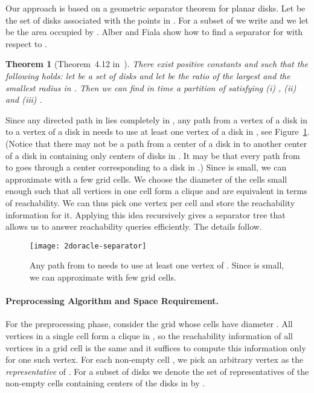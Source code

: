 \documentclass[11pt,a4paper]{paper}
\newtheorem{theorem}{Theorem}[section]
\begin{document}
Our approach is based on a geometric separator theorem for
planar disks.
Let  be the set of disks associated with the points in .
For a subset  of  we write
 and we let
 be the area occupied by .
Alber and Fiala show how to find a separator for 
with respect to  \cite{AlberFiala04}.

\begin{theorem}[Theorem~4.12 in~\cite{AlberFiala04}]
\label{thm:diskseparator}
There exist positive constants  and  such
that the following holds:
let  be a set of  disks and let   be the ratio of the largest
and the smallest radius in .
Then we can find in   time
a partition  of  satisfying
(i) ,
(ii)  and
(iii) .
\end{theorem}
Since any directed path in  lies completely in , any path from
a vertex of a disk in  to a vertex of a disk in  needs to use at least one vertex of a disk in , see
Figure~\ref{fig:separator}.
(Notice that there may not be a path from a center  of a disk in  to another center  of a disk in   containing only centers of disks in . It may be that every path from  to  goes through a center corresponding to a disk in .)
 Since  is small, we can approximate 
with a few grid cells. We choose the diameter of the cells small enough such that
all vertices in one cell form a clique and are equivalent in terms of reachability.
We can thus pick one vertex per cell and store the
reachability information for it. Applying this idea
recursively gives a separator tree
that allows us to answer reachability queries efficiently. The details follow.

\begin{figure}[htb]
\centering
\texttt{[image: 2doracle-separator]}
\caption{Any path from  to  needs to use at least
one vertex of . Since  is small, we can approximate  with
few grid cells.}
\label{fig:separator}
\end{figure}

\paragraph*{Preprocessing Algorithm and Space Requirement.}
For the preprocessing phase, consider the grid  whose
cells have diameter .
All vertices in a single cell form a  clique in , so the reachability information of all vertices in a grid cell is the same and it
suffices to compute this information only
for one such vertex. For each non-empty cell
, we pick an arbitrary vertex 
as the \textit{representative} of .
For a subset  of disks we denote the
 set of  representatives of the non-empty cells containing centers of the disks in  by .
\end{document}
